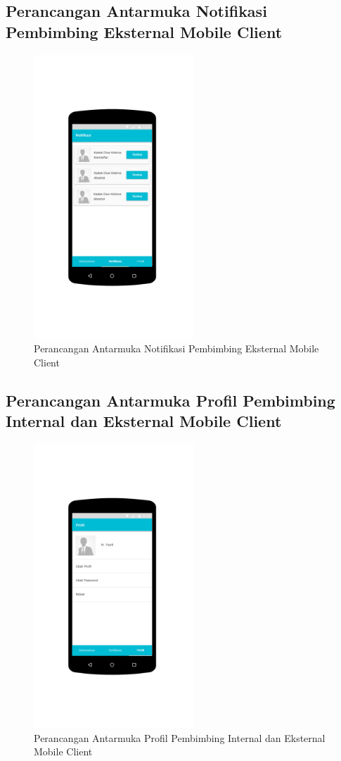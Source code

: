 \subsection{Perancangan Antarmuka Notifikasi Pembimbing Eksternal Mobile Client }
	\begin{figure}[H]
		\includegraphics[width=6cm]{figures/diagram/image132.png}
		\centering
		\caption{Perancangan Antarmuka Notifikasi Pembimbing Eksternal Mobile Client}
	\end{figure}
\subsection{Perancangan Antarmuka Profil Pembimbing Internal dan Eksternal Mobile Client }
	\begin{figure}[H]
		\includegraphics[width=6cm]{figures/diagram/image133.png}
		\centering
		\caption{Perancangan Antarmuka Profil Pembimbing Internal dan  Eksternal Mobile Client}
	\end{figure} 
